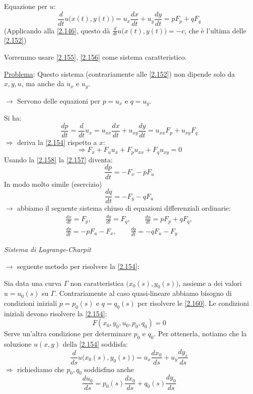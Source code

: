 \documentclass[a4paper,11pt]{report}
\begin{document}
Equazione per $u$:
\begin{equation}
\frac{d}{dt}u\big(x(t),y(t)\big) = u_x \frac{dx}{dt}+u_y\frac{dy}{dt}=p F_p + q F_q 
\label{2.156}
\end{equation}
(Applicando alla \eqref{2.146}, questo d\`a $\frac{d}{dt}u\big(x(t),y(t)\big)=-c$, che \`e l'ultima delle \eqref{2.152})

Vorremmo usare \eqref{2.155}, \eqref{2.156} come sistema caratteristico.

\underline{Problema}: Questo sistema (contrariamente alle \eqref{2.152}) non dipende solo da $x,y,u$, ma anche da $u_x$ e $u_y$.

$\rightarrow$ Servono delle equazioni per $p=u_x$ e $q=u_y$.

Si ha:
\begin{equation}
\frac{dp}{dt}=\frac{d}{dt}u_x = u_{xx}\frac{dx}{dt} + u_{xy}\frac{dy}{dt}=u_{xx}F_p + u_{xy}F_q
\label{2.157}
\end{equation}
$\Rightarrow$ deriva la \eqref{2.154} rispetto a $x$:
\begin{equation}
\Rightarrow F_x + F_u u_x + F_p u_{xx} + F_q u_{xy}=0
\label{2.158}
\end{equation}
Usando la \eqref{2.158} la \eqref{2.157} diventa:
\begin{equation}
\frac{dp}{dt}=-F_x - p F_u
\label{2.159}
\end{equation}
In modo molto simile (esercizio)
\begin{equation}
\frac{dq}{dt}=-F_y - qF_u 
\label{2.159'}
\tag{$\theequation^\prime$}
\end{equation}
$\rightarrow$ abbiamo il seguente sistema chiuso di equazioni differenziali ordinarie:
\begin{equation}
\begin{gathered}
\frac{dx}{dt}= F_p,\qquad \frac{dy}{dt}=F_q, \qquad \frac{du}{dt}=pF_p + qF_q,\\
\frac{dp}{dt}= - p F_u - F_x, \qquad \frac{dq}{dt}=-q F_u - F_y 
\end{gathered}
\label{2.160}
\end{equation}
\centerline{\emph{Sistema di Lagrange-Charpit}}

\smallskip

$\rightarrow$ seguente metodo per risolvere la \eqref{2.154}:

Sia data una curva $\Gamma$ non caratteristica $\big(x_0(s),y_0(s)\big)$, assieme a dei valori $u=u_0(s)$ su $\Gamma$.
Contrariamente al caso quasi-lineare abbiamo bisogno di condizioni iniziali $p=p_0(s)$ e $q=q_0(s)$ per risolvere le \eqref{2.160}. Le condizioni iniziali devono risolvere la \eqref{2.154}: 
\begin{equation}
F(x_0,y_0,u_0,p_0,q_0)=0 
\label{2.161}
\end{equation}
Serve un'altra condizione per determinare $p_0$ e $q_0$.
Per ottenerla, notiamo che la soluzione $u(x,y)$ della \eqref{2.154} soddisfa:
\[
\frac{d}{ds}u\big(x_0(s), y_0(s)\big)=u_x\frac{dx_0}{ds}+u_y\frac{dy_s}{ds}
\]
$\Rightarrow$ richiediamo che $p_0, q_0$ soddisfino anche
\begin{equation}
\frac{du_0}{ds}=p_0(s)\frac{dx_0}{ds}+ q_0(s)\frac{dy_0}{ds}
\label{2.162}
\end{equation}
\end{document}
